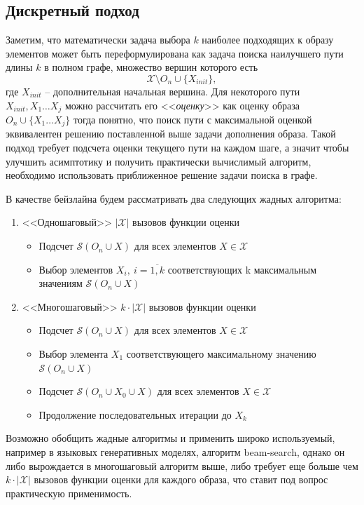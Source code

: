 \documentclass[a4paper,14pt]{extarticle}
\begin{document}
			\subsection{Дискретный подход}\label{discrete}
			Заметим, что математически задача выбора $k$ наиболее подходящих к образу элементов может быть переформулирована как задача поиска наилучшего пути длины $k$ в полном графе, множество вершин которого есть 
			$$\mathcal{X}\setminus O_n \cup \{X_{init}\},$$ где $X_{init}$ -- дополнительная начальная вершина. Для некоторого пути\\ $X_{init}, X_1\dots X_j$ можно рассчитать его <<\textit{оценку}>> как оценку образа \\ $O_n\cup\{X_1\dots X_j\}$ тогда понятно, что поиск пути с максимальной оценкой эквивалентен решению поставленной выше задачи дополнения образа. Такой подход требует подсчета оценки текущего пути на каждом шаге, а значит чтобы улучшить асимптотику и получить практически вычислимый алгоритм, необходимо использовать приближенное решение задачи поиска в графе.
			
			В качестве бейзлайна будем рассматривать два следующих жадных алгоритма:
			\begin{enumerate}
				\item <<Одношаговый>> $|\mathcal{X}|$ вызовов функции оценки
				\begin{itemize}
					\item Подсчет $\mathcal{S}(O_n \cup X)$ для всех элементов $X\in \mathcal{X}$
					\item Выбор элементов $X_i,~i=\overline{1,k}$ соответствующих k максимальным значениям $\mathcal{S}(O_n \cup X)$
				\end{itemize}
				\item <<Многошаговый>> $k\cdot|\mathcal{X}|$ вызовов функции оценки
				\begin{itemize}
					\item Подсчет $\mathcal{S}(O_n \cup X)$ для всех элементов $X\in \mathcal{X}$
					\item Выбор элемента $X_1$ соответствующего максимальному значению $\mathcal{S}(O_n \cup X)$
					\item Подсчет $\mathcal{S}(O_n \cup X_0\cup X)$ для всех элементов $X\in \mathcal{X}$
					\item Продолжение последовательных итерации до $X_k$
				\end{itemize}
			\end{enumerate}
			
			Возможно обобщить жадные алгоритмы и применить широко используемый, например в языковых генеративных моделях, алгоритм beam-search, однако он либо вырождается в многошаговый алгоритм выше, либо требует еще больше чем $k\cdot|\mathcal{X}|$ вызовов функции оценки для каждого образа, что ставит под вопрос практическую применимость.
			
\end{document}
